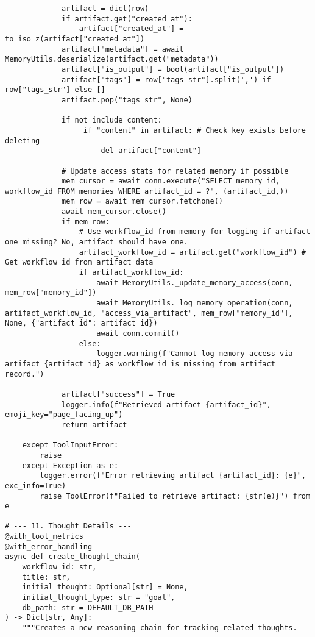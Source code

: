 \documentclass[12pt,a4paper]{article}
\begin{document}
\begin{pageablecode}
\begin{verbatim}
             artifact = dict(row)
             if artifact.get("created_at"):
                 artifact["created_at"] = to_iso_z(artifact["created_at"])
             artifact["metadata"] = await MemoryUtils.deserialize(artifact.get("metadata"))
             artifact["is_output"] = bool(artifact["is_output"])
             artifact["tags"] = row["tags_str"].split(',') if row["tags_str"] else []
             artifact.pop("tags_str", None)

             if not include_content:
                  if "content" in artifact: # Check key exists before deleting
                      del artifact["content"]

             # Update access stats for related memory if possible
             mem_cursor = await conn.execute("SELECT memory_id, workflow_id FROM memories WHERE artifact_id = ?", (artifact_id,))
             mem_row = await mem_cursor.fetchone()
             await mem_cursor.close()
             if mem_row:
                 # Use workflow_id from memory for logging if artifact one missing? No, artifact should have one.
                 artifact_workflow_id = artifact.get("workflow_id") # Get workflow_id from artifact data
                 if artifact_workflow_id:
                     await MemoryUtils._update_memory_access(conn, mem_row["memory_id"])
                     await MemoryUtils._log_memory_operation(conn, artifact_workflow_id, "access_via_artifact", mem_row["memory_id"], None, {"artifact_id": artifact_id})
                     await conn.commit()
                 else:
                     logger.warning(f"Cannot log memory access via artifact {artifact_id} as workflow_id is missing from artifact record.")

             artifact["success"] = True
             logger.info(f"Retrieved artifact {artifact_id}", emoji_key="page_facing_up")
             return artifact

    except ToolInputError:
        raise
    except Exception as e:
        logger.error(f"Error retrieving artifact {artifact_id}: {e}", exc_info=True)
        raise ToolError(f"Failed to retrieve artifact: {str(e)}") from e

# --- 11. Thought Details ---
@with_tool_metrics
@with_error_handling
async def create_thought_chain(
    workflow_id: str,
    title: str,
    initial_thought: Optional[str] = None,
    initial_thought_type: str = "goal",
    db_path: str = DEFAULT_DB_PATH
) -> Dict[str, Any]:
    """Creates a new reasoning chain for tracking related thoughts.


\end{verbatim}
\end{pageablecode}
\end{document}
